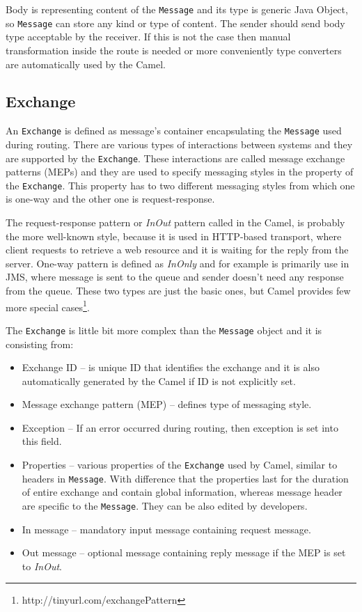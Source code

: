 \documentclass[12pt,final,oneside]{fithesis2}
\begin{document}
Body is representing content of the \texttt{Message} and its type is generic Java Object, so \texttt{Message} can store any kind or type of content. The sender should send body type acceptable by the receiver. If this is not the case then manual transformation inside the route is needed or more conveniently type converters are automatically used by the Camel.


\subsection*{Exchange}
An \texttt{Exchange} is defined as message's container encapsulating the \texttt{Message} used during routing. There are various types of interactions between systems and they are supported by the \texttt{Exchange}. These interactions are called message exchange patterns (MEPs) and they are used to specify messaging styles in the property of the  \texttt{Exchange}. This property has to two different messaging styles from which one is one-way and the other one is request-response. 

The request-response pattern or \textit{InOut} pattern called in the Camel, is probably the more well-known style, because it is used in HTTP-based transport, where client requests to retrieve a web resource and it is waiting for the reply from the server. One-way pattern is defined as \textit{InOnly} and for example is primarily use in JMS, where message is sent to the queue and sender doesn't need any response from the queue. These two types are just the basic ones, but Camel provides few more special cases\footnote{http://tinyurl.com/exchangePattern}.\cite{camel-exchange}

The \texttt{Exchange} is little bit more complex than the \texttt{Message} object and it is consisting from\cite{camel-in-action}:
\begin{itemize}
\item
Exchange ID -- is unique ID that identifies the exchange and it is also automatically generated by the Camel if ID is not explicitly set.

\item
Message exchange pattern (MEP) -- defines type of messaging style.

\item
Exception -- If an error occurred during routing, then exception is set into this field.

\item
Properties -- various properties of the \texttt{Exchange} used by Camel, similar to headers in \texttt{Message}. With difference that the properties last for the duration of entire exchange and contain global information, whereas message header are specific to the \texttt{Message}. They can be also edited by developers.

\item
In message -- mandatory input message containing request message.

\item
Out message -- optional message containing reply message if the MEP is set to \textit{InOut}.
\end{itemize}
\end{document}
